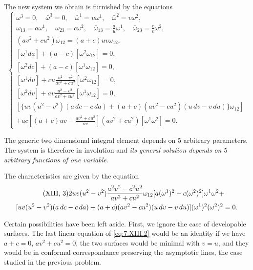 \documentclass[leqno,11pt]{book}
\numberwithin{equation}{chapter}
\theoremstyle{shape1}
\theoremstyle{shape0}
\theoremstyle{shape2}
\theoremstyle{definition}
\begin{document}
The new system we obtain is furnished by the equations
\begin{equation}
  \label{eq:7.XIII.2}\tag{XIII, 2}
  \left\{
    \begin{gathered}
      \omega^{3}=0,\quad\bar\omega^{3}=0,\quad\bar\omega^{1}=u\omega^{1},\quad\bar\omega^{2}=v\omega^{2},\\
      \omega_{13}=a\omega^{1},\quad\omega_{23}=c\omega^{2},\quad\bar\omega_{13}=\frac{a}{u}\omega^{1},\quad\bar\omega_{23}=\frac{c}{v}\omega^{2},\\
      (av^{2}+cu^{2})\bar\omega_{12}=(a+c)uv\omega_{12},\\
      [\omega^{1}da]+(a-c)[\omega^{2}\omega_{12}]=0,\\
      [\omega^{2}dc]+(a-c)[\omega^{1}\omega_{12}]=0,\\
      [\omega^{1}du]+cu\frac{u^{2}-v^{2}}{av^{2}+cu^{2}}[\omega^{2}\omega_{12}]=0,\\
      [\omega^{2}dv]+av\frac{u^{2}-v^{2}}{av^{2}+cu^{2}}[\omega^{1}\omega_{12}]=0,\\
      [\{uv(u^{2}-v^{2})(a\,dc-c\,da)+(a+c)(av^{2}-cu^{2})(u\,dv-v\,du)\}\omega_{12}]\\
      +ac\left[(a+c)uv-\frac{av^{2}+cu^{2}}{uv}\right](av^{2}+cu^{2})[\omega^{1}\omega^{2}]=0.
    \end{gathered}
  \right.
\end{equation}

The generic two dimensional integral element depends on $5$ arbitrary parameters. The system is therefore in involution and \emph{its general solution depends on $5$ arbitrary functions of one variable}.

The characteristics are given by the equation
\begin{gather}
  \label{eq:7.XIII.3}\tag{XIII, 3}
  2uv(u^{2}-v^{2})\frac{a^{2}v^{2}-c^{2}u^{2}}{av^{2}+cu^{2}}\omega_{12}[a(\omega^{1})^{2}-c(\omega^{2})^{2}]\omega^{1}\omega^{2}+\\
  [uv(u^{2}-v^{2})(a\,dc-c\,da)+(a+c)(av^{2}-cu^{2})(u\,dv-v\,du)](\omega^{1})^{2}(\omega^{2})^{2}=0.\notag
\end{gather}

Certain possibilities have been left aside. First, we ignore the case of developable surfaces. The last linear equation of \eqref{eq:7.XIII.2} would be an identity if we have $a+c=0$, $av^{2}+cu^{2}=0$, the two surfaces would be minimal with $v=u$, and they would be in conformal correspondance preserving the asymptotic lines, the case studied in the previous problem.
\end{document}
